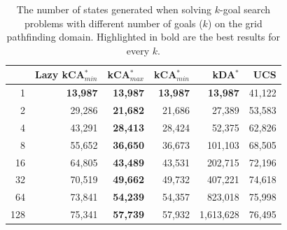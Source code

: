 \documentclass{aicom2e}
\newcommand{\kgs}{$k$-goal search}
\newcommand{\kastarmin}{kCA$^*_{min}$}
\newcommand{\kastarmax}{kCA$^*_{max}$}
\newcommand{\kxastar}{kDA$^*$}
\begin{document}
\begin{table}[]
    \centering
    \begin{tabular}{|r|r|r|r|r|r|}
    \hline
        & \multicolumn{1}{c|}{Lazy \kastarmin{}} & \kastarmax &      \kastarmin       &  \kxastar & UCS       \\

        \hline
1                         & \textbf{13,987}                      & \textbf{13,987}           & \textbf{13,987}           & \textbf{13,987}                 & 41,122                      \\
2                         & 29,286                               & \textbf{21,682}           & 21,686                    & 27,389                          & 53,583                      \\
4                         & 43,291                               & \textbf{28,413}           & 28,424                    & 52,375                          & 62,826                      \\
8                         & 55,652                               & \textbf{36,650}           & 36,673                    & 101,103                         & 68,505                      \\
16                        & 64,805                               & \textbf{43,489}           & 43,531                    & 202,715                         & 72,196                      \\
32                        & 70,519                               & \textbf{49,662}           & 49,732                    & 407,221                         & 74,618                      \\
64                        & 73,841                               & \textbf{54,239}           & 54,357                    & 823,018                         & 75,998                      \\
128                       & 75,341                               & \textbf{57,739}           & 57,932                    & 1,613,628                       & 76,495\\
\hline
    \end{tabular}
    \caption{The number of states generated when solving \kgs{} problems with different number of goals ($k$) on the grid pathfinding domain. Highlighted in bold are the best results for every $k$.}
    \label{tab:pathfinding-generated}
\end{table}


\end{document}
